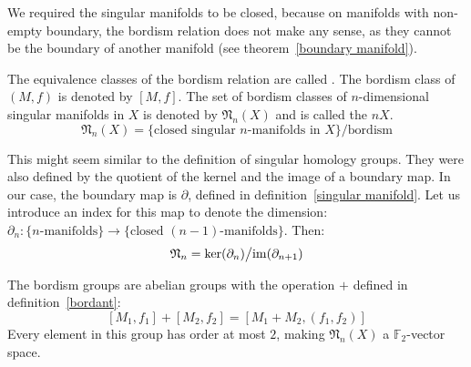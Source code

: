 \documentclass[a4paper,11pt]{article}
\begin{document}
\begin{remark}
    We required the singular manifolds to be closed, because on manifolds with non-empty boundary, the bordism relation does not make any sense, as they cannot be the boundary of another manifold (see theorem\ \ref{boundary manifold}).
\end{remark}

\begin{definition}
    The equivalence classes of the bordism relation are called . 
    The bordism class of \((M,f)\) is denoted by \([M,f]\). 
    The set of bordism classes of \(n\)-dimensional singular manifolds in \(X\) is denoted by \(\mathfrak{N}_n(X)\) and is called the \(n\)\(X\).
    \[\mathfrak{N}_n(X)=\{\text{closed singular \(n\)-manifolds in \(X\)}\}\big/\text{bordism}\]
\end{definition}

\begin{observation}
    This might seem similar to the definition of singular homology groups. They were also defined by the quotient of the kernel and the image of a boundary map.
    In our case, the boundary map is \(\partial\), defined in definition\ \ref{singular manifold}. Let us introduce an index for this map to denote the dimension: \(\partial_n:\{n\text{-manifolds}\}\to\{\text{closed }(n-1)\text{-manifolds}\}\).
    Then: \[\mathfrak{N}_n=\ker(\partial_n)\big/\mathrm{im}(\partial_{n+1})\]
\end{observation}

\begin{theorem}\label{group structure}
    The bordism groups are abelian groups with the operation \(+\) defined in definition\ \ref{bordant}:
    \[[M_1,f_1]+[M_2,f_2]=[M_1+M_2,(f_1,f_2)]\]
    Every element in this group has order at most \(2\), making \(\mathfrak{N}_n(X)\) a \(\mathbb{F}_2\)-vector space.
\end{theorem}
\end{document}
